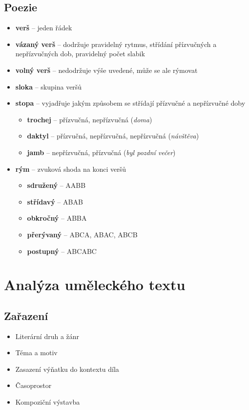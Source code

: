 \subsection{Poezie}
\begin{itemize}
\item[] \textbf{verš} -- jeden řádek
\item[] \textbf{vázaný verš} -- dodržuje pravidelný rytmus, střídání přízvučných a nepřízvučných dob, pravidelný počet slabik
\item[] \textbf{volný verš} -- nedodržuje výše uvedené, může se ale rýmovat
\item[] \textbf{sloka} -- skupina veršů
\item[] \textbf{stopa} -- vyjadřuje jakým způsobem se střídají přízvučné a nepřízvučné doby
\begin{itemize}
\item \textbf{trochej} -- přízvučná, nepřízvučná (\textit{doma})
\item \textbf{daktyl} -- přízvučná, nepřízvučná, nepřízvučná (\textit{návštěva})
\item \textbf{jamb} -- nepřízvučná, přízvučná (\textit{byl pozdní večer})
\end{itemize}
\item[] \textbf{rým} -- zvuková shoda na konci veršů
\begin{itemize}
\item \textbf{sdružený} -- AABB
\item \textbf{střídavý} -- ABAB
\item \textbf{obkročný} -- ABBA
\item \textbf{přerývaný} -- ABCA, ABAC, ABCB
\item \textbf{postupný} -- ABCABC

\end{itemize}
\end{itemize}

\newpage
\section{Analýza uměleckého textu}
\subsection{Zařazení}
\begin{itemize}
\item Literární druh a žánr
\item Téma a motiv
\item Zasazení výňatku do kontextu díla
\item Časoprostor
\item Kompoziční výstavba
\end{itemize}
